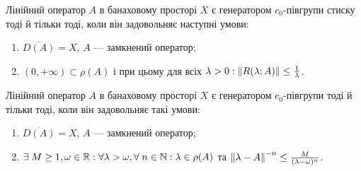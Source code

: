 \begin{theory}
    \begin{theorem*}
        Лінійний оператор $A$ в банаховому просторі $X$ є 
    генератором $c_0$-півгрупи стиску тоді й тільки тоді, коли він задовольняє 
    наступні умови:
    \begin{enumerate}
        \item $\overline{D(A)} = X$, $A$ --- замкнений оператор;
        \item $(0, +\infty) \subset \rho(A)$ і при цьому для всіх $\lambda > 0 : \left\lVert R(\lambda; A)\right\rVert \leq \frac{1}{\lambda}$.
    \end{enumerate}
    \end{theorem*}
    \begin{theorem*}
        Лінійний оператор $A$ в банаховому 
    просторі $X$ є генератором $c_0$-півгрупи тоді й тільки тоді, коли він задовольняє 
    такі умови:
    \begin{enumerate}
        \item $\overline{D(A)} = X$, $A$ --- замкнений оператор;
        \item $\exists \; M \geq 1, \omega \in \mathbb{R} : \forall \lambda > \omega, \forall \; n \in \mathbb{N} : \lambda \in \rho(A)$ та
        $\left\lVert\lambda - A\right\rVert^{-n} \leq \frac{M}{(\lambda - \omega)^n}$.
    \end{enumerate}
    \end{theorem*}
\end{theory}